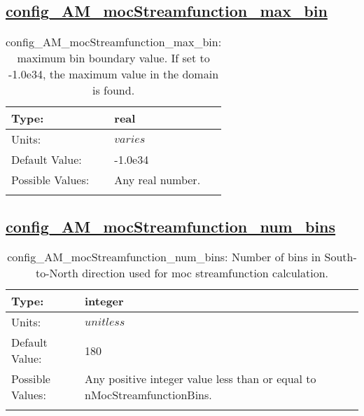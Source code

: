 \subsection[config\_AM\_mocStreamfunction\_max\_bin]{\hyperref[sec:nm_tab_AM_mocStreamfunction]{config\_AM\_mocStreamfunction\_max\_bin}}
\label{subsec:nm_sec_config_AM_mocStreamfunction_max_bin}
\begin{center}
\begin{longtable}{| p{2.0in} || p{4.0in} |}
    \hline
    Type: & real \\
    \hline
    Units: & $varies$ \\
    \hline
    Default Value: & -1.0e34 \\
    \hline
    Possible Values: & Any real number. \\
    \hline
    \caption{config\_AM\_mocStreamfunction\_max\_bin: maximum bin boundary value.  If set to -1.0e34, the maximum value in the domain is found.}
\end{longtable}
\end{center}
\subsection[config\_AM\_mocStreamfunction\_num\_bins]{\hyperref[sec:nm_tab_AM_mocStreamfunction]{config\_AM\_mocStreamfunction\_num\_bins}}
\label{subsec:nm_sec_config_AM_mocStreamfunction_num_bins}
\begin{center}
\begin{longtable}{| p{2.0in} || p{4.0in} |}
    \hline
    Type: & integer \\
    \hline
    Units: & $unitless$ \\
    \hline
    Default Value: & 180 \\
    \hline
    Possible Values: & Any positive integer value less than or equal to nMocStreamfunctionBins. \\
    \hline
    \caption{config\_AM\_mocStreamfunction\_num\_bins: Number of bins in South-to-North direction used for moc streamfunction calculation.}
\end{longtable}
\end{center}

